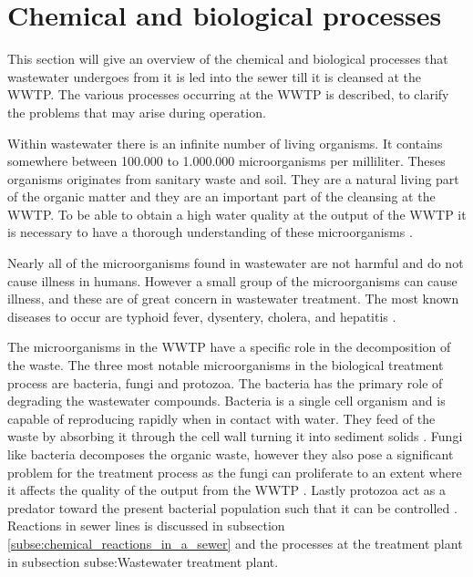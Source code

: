 \section{Chemical and biological processes}\label{se:chemical_process}
This section will give an overview of the chemical and biological processes that wastewater undergoes from it is led into the sewer till it is cleansed at the WWTP. The various processes occurring at the WWTP is described, to clarify the problems that may arise during operation. 

Within wastewater there is an infinite number of living organisms.%
It contains somewhere between 100.000 to 1.000.000 microorganisms per milliliter. Theses organisms originates from sanitary waste and soil. They are a natural living part of the organic matter and they are an important part of the cleansing at the WWTP. To be able to obtain a high water quality at the output of the WWTP it is necessary to have a thorough understanding of these microorganisms \cite{biological_wastewater}. %

Nearly all of the microorganisms found in wastewater are not harmful and do not cause illness in humans. However a small group of the microorganisms can cause illness, and these are of great concern in wastewater treatment. The most known diseases to occur are typhoid fever, dysentery, cholera, and hepatitis \cite{biological_wastewater}.

The microorganisms in the WWTP have a specific role in the decomposition of the waste. The three most notable microorganisms in the biological treatment process are bacteria, fungi and protozoa. The bacteria has the primary role of degrading the wastewater compounds.  Bacteria is a single cell organism and is capable of reproducing rapidly when in contact with water. They feed of the waste by absorbing it through the cell wall turning it into sediment solids \cite{biological_wastewater}. 
Fungi like bacteria decomposes the organic waste, however they also pose a significant problem for the treatment process as the fungi can proliferate to an extent where it affects the quality of the output from the WWTP \cite{fungi_source}. 
Lastly protozoa act as a predator toward the present bacterial population such that it can be controlled \cite{biological_wastewater}. Reactions in sewer lines is discussed in subsection \ref{subse:chemical_reactions_in_a_sewer} and the processes at the treatment plant in subsection {subse:Wastewater treatment plant}.

